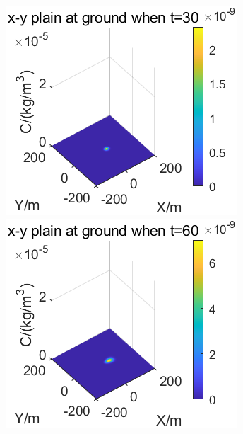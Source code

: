 \documentclass{article}
\begin{document}
	\begin{figure}[htbp]
		\begin{minipage}{0.33\textwidth}
			\includegraphics[width=\textwidth]{pics/g=-0.5,t=30.png}
		\end{minipage}
		\begin{minipage}{0.33\textwidth}
			\includegraphics[width=\textwidth]{pics/g=-0.5,t=60.png}
		\end{minipage}

\end{figure}
\end{document}
